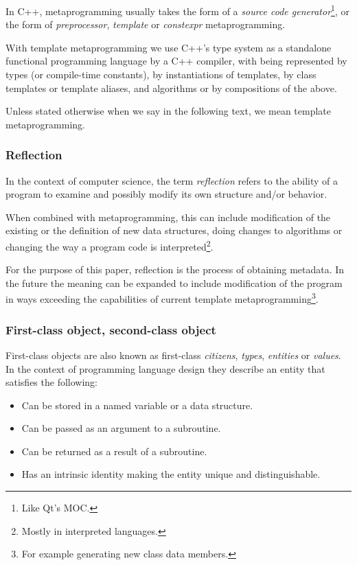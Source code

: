 In C++, metaprogramming usually takes the form of a
{\em source code generator}\footnote{Like Qt's MOC.}, or the form
of {\em preprocessor}, {\em template} or {\em constexpr} metaprogramming.

With template metaprogramming we use C++'s type system
as a standalone functional programming language  by a C++
compiler, with  being
represented by types (or compile-time constants),
 by instantiations of templates,
 by class templates or template aliases, and
algorithms or  by compositions of the above.

Unless stated otherwise when we say  in the following text,
we mean template metaprogramming.

\subsubsection{Reflection}

In the context of computer science,
the term {\em reflection} refers to the ability of a program to examine
and possibly modify its own structure and/or behavior.

When combined with metaprogramming, this can include modification of the existing
or the definition of new data structures, doing changes to algorithms or changing the way
a program code is interpreted\footnote{Mostly in interpreted languages.}.

For the purpose of this paper, reflection is the process of obtaining metadata.
In the future the meaning can be expanded to include modification of the program
in ways exceeding the capabilities of current template
metaprogramming\footnote{For example generating new class data members.}.

\subsubsection{First-class object, second-class object}
\label{term-first-class}

First-class objects are also known as first-class {\em citizens}, {\em types},
{\em entities} or {\em values}.
In the context of programming language design they describe an entity that satisfies
the following:

\begin{itemize}
	\item{Can be stored in a named variable or a data structure.}
	\item{Can be passed as an argument to a subroutine.}
	\item{Can be returned as a result of a subroutine.}
	\item{Has an intrinsic identity making the entity unique and distinguishable.}
\end{itemize}


